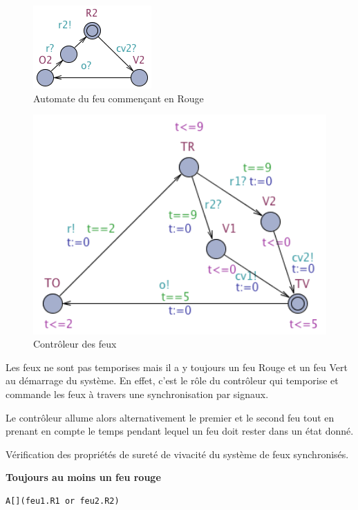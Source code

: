 \documentclass[11pt]{article}
\begin{document}
\begin{figure}[H]
	\centering
	\includegraphics{ressources/part2/Q8-2.png}
	\caption{Automate du feu commençant en Rouge}
\end{figure}

\begin{figure}[H]
	\centering
	\includegraphics[width=1\textwidth]{ressources/part2/Q8-3.png}
	\caption{Contrôleur des feux}
\end{figure}

Les feux ne sont pas temporises mais il a y toujours un feu Rouge et un feu Vert au démarrage du système. En effet, c'est le rôle du contrôleur qui temporise et commande les feux à travers une synchronisation par signaux. 

Le contrôleur allume alors alternativement le premier et le second feu tout en prenant en compte le temps pendant lequel un feu doit rester dans un état donné.

Vérification des propriétés de sureté de vivacité du système de feux synchronisés.

\textbf{Toujours au moins un feu rouge}
\begin{verbatim}
A[](feu1.R1 or feu2.R2)
\end{verbatim}
\end{document}
